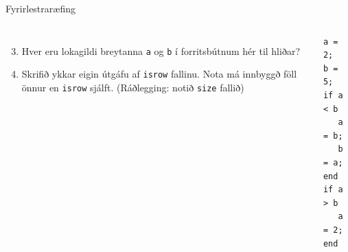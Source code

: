 \documentclass{beamer}
\begin{document}
\begin{frame}[fragile]{Fyrirlestraræfing}
\begin{columns}
\begin{enumerate}
\setcounter{enumi}{2}
 \item Hver eru lokagildi breytanna \texttt{a} og \texttt{b} í forritsbútnum hér til hliðar?
 \item Skrifið ykkar eigin útgáfu af \texttt{isrow} fallinu. Nota má innbyggð föll önnur en \texttt{isrow} sjálft. (Ráðlegging: notið \texttt{size} fallið)
\end{enumerate}
\begin{verbatim}
a = 2; 
b = 5;
if a < b
   a = b; 
   b = a;
end
if a > b
   a = 2;
end
\end{verbatim}
\end{columns}
\end{frame}
\end{document}
